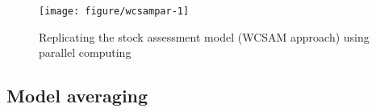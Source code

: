 \documentclass[a4paper,english,10pt]{article}\usepackage[]{graphicx}\usepackage[]{color}
\makeatletter
\def\maxwidth{ %
  \ifdim\Gin@nat@width>\linewidth
    \linewidth
  \else
    \Gin@nat@width
  \fi
}
\newenvironment{knitrout}{}{} %
\makeatother
\begin{document}
\begin{knitrout}
\color{fgcolor}\begin{figure}[H]

{\centering \texttt{[image: figure/wcsampar-1]} 

}

\caption[Replicating the stock assessment model (WCSAM approach) using parallel computing]{Replicating the stock assessment model (WCSAM approach) using parallel computing}\label{fig:wcsampar}
\end{figure}


\end{knitrout}







\subsection{Model averaging}
\end{document}
